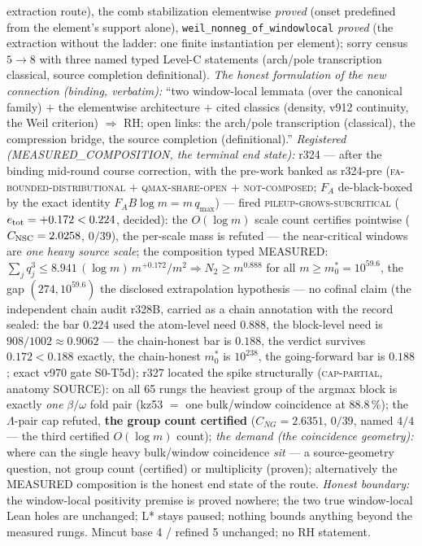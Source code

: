 {extraction route), the comb stabilization elementwise
\emph{proved} (onset predefined from the element's support alone),
\texttt{weil\_nonneg\_of\_windowlocal} \emph{proved} (the
extraction without the ladder: one finite instantiation per
element); sorry census $5 \to 8$ with three named typed Level-C
statements (arch/pole transcription classical, source completion
definitional).  \emph{The honest formulation of the new connection
(binding, verbatim):} ``two window-local lemmata (over the
canonical family) $+$ the elementwise architecture $+$ cited
classics (density, v912 continuity, the Weil criterion)
$\Rightarrow$ RH; open links: the arch/pole transcription
(classical), the compression bridge, the source completion
(definitional).''  \emph{Registered (MEASURED\_COMPOSITION, the
terminal end state):} r324 --- after the binding mid-round course
correction, with the pre-work banked as r324-pre
(\textsc{fa-bounded-distributional} $+$ \textsc{qmax-share-open}
$+$ \textsc{not-composed}; $F_A$ de-black-boxed by the exact
identity $F_A B \log m = m\,q_{\max}$) --- fired
\textsc{pileup-grows-subcritical} ($e_{\rm tot} = +0.172 < 0.224$,
decided): the $O(\log m)$ scale count certifies pointwise
($C_{\rm NSC} = 2.0258$, $0/39$), the per-scale mass is refuted
--- the near-critical windows are \emph{one heavy source scale};
the composition typed MEASURED: $\sum_j q_j^3 \le
8.941\,(\log m)\,m^{+0.172}/m^2 \Rightarrow N_2 \ge m^{0.888}$ for
all $m \ge m_0^* = 10^{59.6}$, the gap $(274, 10^{59.6})$ the
disclosed extrapolation hypothesis --- no cofinal claim (the
independent chain audit r328B, carried as a chain annotation with
the record sealed: the bar $0.224$ used the atom-level need
$0.888$, the block-level need is $908/1002 \approx 0.9062$ --- the
chain-honest bar is $0.188$, the verdict survives $0.172 < 0.188$
exactly, the chain-honest $m_0^*$ is $10^{238}$, the going-forward
bar is $0.188$; exact v970 gate S0-T5d); r327
located the spike structurally (\textsc{cap-partial}, anatomy
SOURCE): on all 65 rungs the heaviest group of the argmax block is
exactly \emph{one} $\beta/\omega$ fold pair (kz53 $=$ one
bulk/window coincidence at $88.8\,\%$); the $\Lambda$-pair cap
refuted, \textbf{the group count certified} ($C_{NG} = 2.6351$,
$0/39$, named $4/4$ --- the third certified $O(\log m)$ count);
\emph{the demand (the coincidence geometry):} where can the single
heavy bulk/window coincidence \emph{sit} --- a source-geometry
question, not group count (certified) or multiplicity (proven);
alternatively the MEASURED composition is the honest end state of
the route.  \emph{Honest boundary:} the window-local positivity
premise is proved nowhere; the two true window-local Lean holes
are unchanged; L* stays paused; nothing bounds anything beyond the
measured rungs.  Mincut base 4 / refined 5 unchanged; no RH
statement.\par}


